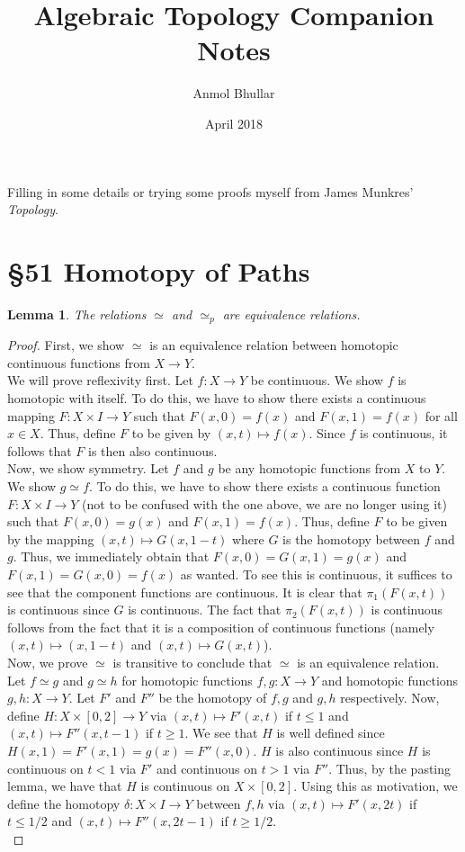 \documentclass{article}
\title{Algebraic Topology Companion Notes}
\author{Anmol Bhullar}
\date{April 2018}
\newtheorem{lemma}[theorem]{Lemma}
\begin{document}
\maketitle

Filling in some details or trying some proofs myself from James Munkres' \textit{Topology}.

\section*{\S 51 Homotopy of Paths}

\setcounter{section}{51}

\begin{lemma}
	The relations $\simeq$ and $\simeq_p$ are equivalence relations.
\end{lemma}
\begin{proof}
	First, we show $\simeq$ is an equivalence relation between homotopic continuous functions from $X\to Y$.\\
	We will prove reflexivity first. Let $f: X\to Y$ be continuous. We show $f$ is homotopic with itself. To do this, we have to show there exists a continuous mapping 
	$F:X\times I\to Y$ such that $F(x,0) = f(x)$ and $F(x,1)=f(x)$ for all $x\in X$. Thus, define $F$ to be given by $(x,t)\mapsto f(x)$. Since $f$ is continuous, it 
	follows that $F$ is then also continuous.\\
	Now, we show symmetry. Let $f$ and $g$ be any homotopic functions from $X$ to $Y$. We show $g\simeq f$. To do this,
	we have to show there exists a continuous function $F: X\times I\to Y$ (not to be confused with the one above, we are no longer using it) such that $F(x,0) = g(x)$ and
	$F(x,1) = f(x)$. Thus, define $F$ to be given by the mapping $(x,t) \mapsto G(x,1-t)$ where $G$ is the homotopy between $f$ and $g$. Thus, we immediately obtain that
	$F(x,0)=G(x,1)=g(x)$ and $F(x,1)=G(x,0)=f(x)$ as wanted. To see this is continuous, it suffices to see that the component functions are continuous. It is clear that
	$\pi_1(F(x,t))$ is continuous since $G$ is continuous. The fact that $\pi_2(F(x,t))$ is continuous follows from the fact that it is a composition of continuous functions
	(namely $(x,t)\mapsto (x,1-t)$ and $(x,t)\mapsto G(x,t)$).\\
	Now, we prove $\simeq$ is transitive to conclude that $\simeq$ is an equivalence relation. Let $f\simeq g$
	and $g\simeq h$ for homotopic functions $f,g:X\to Y$ and homotopic functions $g,h:X\to Y$. Let $F'$ and $F''$ be the homotopy of $f,g$ and $g,h$ respectively.
	Now, define $H:X\times [0,2]\to Y$ via $(x,t)\mapsto F'(x,t)$ if $t\leq 1$ and $(x,t)\mapsto F''(x,t-1)$ if $t\geq 1$. We see that $H$ is well defined since
	$H(x,1) = F'(x,1) = g(x) = F''(x,0)$. $H$ is also continuous since $H$ is continuous on $t<1$ via $F'$ and continuous on $t>1$ via $F''$. Thus, by the pasting lemma, we have
	that $H$ is continuous on $X\times [0,2]$. Using this as motivation, we define the homotopy $\delta: X\times I \to Y$ between $f,h$ via $(x,t) \mapsto F'(x,2t)$ if $t\leq 
	1/2$ and $(x,t)\mapsto F''(x,2t-1)$ if $t\geq 1/2$.\\
	

\end{proof}
\end{document}
